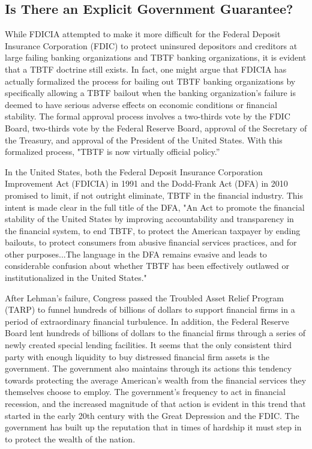 \subsection{Is There an Explicit Government Guarantee?}
 
While FDICIA attempted to make it more difficult for the Federal Deposit Insurance Corporation (FDIC) to protect uninsured depositors and creditors at large failing banking organizations and TBTF banking organizations, it is evident that a TBTF doctrine still exists. In fact, one might argue that FDICIA has actually formalized the process for bailing out TBTF banking organizations by specifically allowing a TBTF bailout when the banking organization's failure is deemed to have serious adverse effects on economic conditions or financial stability.  The formal approval process involves a two-thirds vote by the FDIC Board, two-thirds vote by the Federal Reserve Board, approval of the Secretary of the Treasury, and approval of the President of the United States.\cite{Brewer}  With this formalized process, "TBTF is now virtually official policy.'' \cite{Baker}

In the United States, both the Federal Deposit Insurance Corporation Improvement Act (FDICIA) in 1991 and the Dodd-Frank Act (DFA) in 2010 promised to limit, if not outright eliminate, TBTF in the financial industry.  This intent is made clear in the full title of the DFA, "An Act to promote the financial stability of the United States by improving accountability and transparency in the financial system, to end TBTF, to protect the American taxpayer by ending bailouts, to protect consumers from abusive financial services practices, and for other purposes...The language in the DFA remains evasive and leads to considerable confusion about whether TBTF has been effectively outlawed or institutionalized in the United States."\cite{Kaufman}

After Lehman's failure, Congress passed the Troubled Asset Relief Program (TARP) to funnel hundreds of billions of dollars to support financial firms in a period of extraordinary financial turbulence. In addition, the Federal Reserve Board lent hundreds of billions of dollars to the financial firms through a series of newly created special lending facilities.\cite{Baker}  It seems that the only consistent third party with enough liquidity to buy distressed financial firm assets is the government.  The government also maintains through its actions this tendency towards protecting the average American's wealth from the financial services they themselves choose to employ.  The government's frequency to act in financial recession, and the increased magnitude of that action is evident in this trend that started in the early 20th century with the Great Depression and the FDIC.  The government has built up the reputation that in times of hardship it must step in to protect the wealth of the nation.

